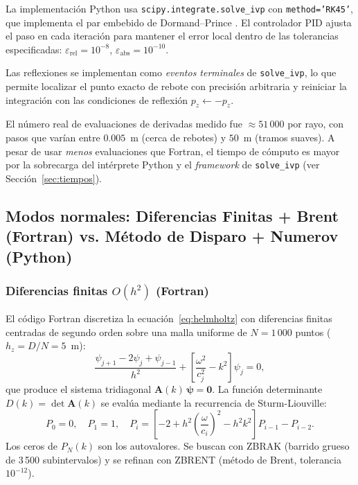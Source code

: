 \documentclass[12pt,a4paper]{article}
\begin{document}
La implementación Python usa \texttt{scipy.integrate.solve\_ivp} con
\texttt{method='RK45'}, que implementa el par embebido de Dormand--Prince
\cite{dormand1980}. El controlador PID ajusta el paso en cada iteración para
mantener el error local dentro de las tolerancias especificadas:
$\varepsilon_{\text{rel}} = 10^{-8}$, $\varepsilon_{\text{abs}} = 10^{-10}$.

Las reflexiones se implementan como \emph{eventos terminales} de \texttt{solve\_ivp},
lo que permite localizar el punto exacto de rebote con precisión
arbitraria y reiniciar la integración con las condiciones de reflexión
$p_z \leftarrow -p_z$.

El número real de evaluaciones de derivadas medido fue $\approx 51\,000$ por
rayo, con pasos que varían entre $0.005$~m (cerca de rebotes) y $50$~m
(tramos suaves). A pesar de usar \emph{menos} evaluaciones que Fortran,
el tiempo de cómputo es mayor por la sobrecarga del intérprete Python y
el \emph{framework} de \texttt{solve\_ivp} (ver Sección~\ref{sec:tiempos}).

\subsection{Modos normales: Diferencias Finitas + Brent (Fortran) vs.
            Método de Disparo + Numerov (Python)}

\subsubsection{Diferencias finitas $O(h^2)$ (Fortran)}

El código Fortran discretiza la ecuación~\eqref{eq:helmholtz} con diferencias
finitas centradas de segundo orden sobre una malla uniforme de $N=1\,000$
puntos ($h_z = D/N = 5$~m):
\begin{equation}
  \frac{\psi_{j+1} - 2\psi_j + \psi_{j-1}}{h^2}
  + \left[\frac{\omega^2}{c_j^2} - k^2\right]\psi_j = 0,
  \label{eq:fd}
\end{equation}
que produce el sistema tridiagonal $\mathbf{A}(k)\,\boldsymbol{\psi} = \mathbf{0}$.
La función determinante $D(k) = \det\mathbf{A}(k)$ se evalúa mediante la
recurrencia de Sturm-Liouville:
\begin{equation}
  P_0 = 0,\quad P_1 = 1,\quad
  P_i = \left[-2 + h^2\!\left(\frac{\omega}{c_i}\right)^2 - h^2 k^2\right]P_{i-1}
        - P_{i-2}.
  \label{eq:sturm}
\end{equation}
Los ceros de $P_N(k)$ son los autovalores. Se buscan con \textsc{ZBRAK}
(barrido grueso de 3\,500 subintervalos) y se refinan con \textsc{ZBRENT}
(método de Brent, tolerancia $10^{-12}$).
\end{document}
